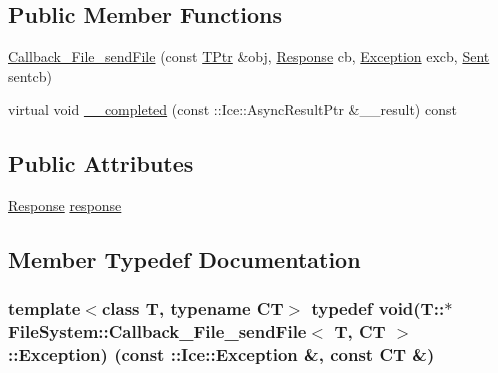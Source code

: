 \subsection*{Public Member Functions}
\begin{DoxyCompactItemize}
\item 
\hyperlink{class_file_system_1_1_callback___file__send_file_a5dfd7d4e2727b7b8be3f1aab6b57124a}{Callback\+\_\+\+File\+\_\+send\+File} (const \hyperlink{class_file_system_1_1_callback___file__send_file_a666a8ba5af39dac36fdcb52b0916e2b9}{T\+Ptr} \&obj, \hyperlink{class_file_system_1_1_callback___file__send_file_a3d604d3396d90e28e0f498d66e31e906}{Response} cb, \hyperlink{class_file_system_1_1_callback___file__send_file_a625b27b53ceb949eaa41ae4908958999}{Exception} excb, \hyperlink{class_file_system_1_1_callback___file__send_file_ac3926735f3de742485a01c7e0e08dd2d}{Sent} sentcb)
\item 
virtual void \hyperlink{class_file_system_1_1_callback___file__send_file_a8272471d8bad3733858c33daf74bf1a7}{\+\_\+\+\_\+completed} (const \+::Ice\+::\+Async\+Result\+Ptr \&\+\_\+\+\_\+result) const 
\end{DoxyCompactItemize}
\subsection*{Public Attributes}
\begin{DoxyCompactItemize}
\item 
\hyperlink{class_file_system_1_1_callback___file__send_file_a3d604d3396d90e28e0f498d66e31e906}{Response} \hyperlink{class_file_system_1_1_callback___file__send_file_a5a393b1e37b7cd16f4154ca5c91af37e}{response}
\end{DoxyCompactItemize}


\subsection{Member Typedef Documentation}
\hypertarget{class_file_system_1_1_callback___file__send_file_a625b27b53ceb949eaa41ae4908958999}{}
\subsubsection[{Exception}]{\setlength{\rightskip}{0pt plus 5cm}template$<$class T, typename C\+T$>$ typedef void(T\+::$\ast$ {\bf File\+System\+::\+Callback\+\_\+\+File\+\_\+send\+File}$<$ T, C\+T $>$\+::Exception) (const \+::Ice\+::\+Exception \&, const C\+T \&)}\label{class_file_system_1_1_callback___file__send_file_a625b27b53ceb949eaa41ae4908958999}
\hypertarget{class_file_system_1_1_callback___file__send_file_a3d604d3396d90e28e0f498d66e31e906}{}
